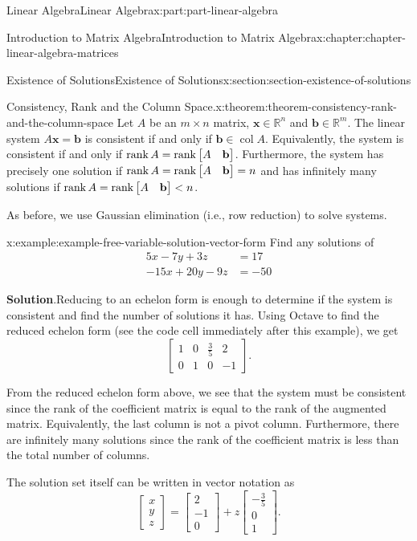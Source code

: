 \documentclass[twoside,10pt,]{book}
\newcommand{\blocktitlefont}{\relax}
\numberwithin{equation}{part}
\newcommand{\RR}{\mathbb{R}}
\providecommand{\vb}[1]{\mathbf{#1}}
\newcommand{\col}[1]{\operatorname{col}{#1}}
\providecommand{\rank}[1]{\operatorname{rank}{#1}}
\newcommand{\lt}{<}
\begin{document}
\begin{partptx}{Linear Algebra}{}{Linear Algebra}{}{}{x:part:part-linear-algebra}
\begin{chapterptx}{Introduction to Matrix Algebra}{}{Introduction to Matrix Algebra}{}{}{x:chapter:chapter-linear-algebra-matrices}
\begin{sectionptx}{Existence of Solutions}{}{Existence of Solutions}{}{}{x:section:section-existence-of-solutions}
\begin{theorem}{Consistency, Rank and the Column Space.}{}{x:theorem:theorem-consistency-rank-and-the-column-space}
Let \(A\) be an \(m\times n\) matrix, \(\vb{x}\in\RR^{n}\) and \(\vb{b}\in\RR^{m}\). The linear system \(A\vb{x} = \vb{b}\) is consistent if and only if \(\vb{b}\in\col{A}\). Equivalently, the system is consistent if and only if \(\rank{A} = \rank{\mqty[A & \vb{b}]}\). Furthermore, the system has precisely one solution if \(\rank{A} = \rank{\mqty[A & \vb{b}]} = n\) and has infinitely many solutions if \(\rank{A} = \rank{\mqty[A & \vb{b}]} \lt n\).%
\end{theorem}
As before, we use Gaussian elimination (i.e., row reduction) to solve systems.%
\begin{example}{}{x:example:example-free-variable-solution-vector-form}%
Find any solutions of%
\begin{align*}
5x - 7y + 3z &= 17\\
-15x + 20y - 9z &= -50 
\end{align*}
%
\par\smallskip%
\noindent\textbf{\blocktitlefont Solution}.\hypertarget{g:solution:idm1651004264}{}\quad{}Reducing to an echelon form is enough to determine if the system is consistent and find the number of solutions it has. Using Octave to find the reduced echelon form (see the code cell immediately after this example), we get%
\begin{equation*}
\begin{bmatrix} 1 & 0 & \frac{3}{5} & 2 \\ 0 & 1 & 0 & -1\end{bmatrix}.
\end{equation*}
%
\par
From the reduced echelon form above, we see that the system must be consistent since the rank of the coefficient matrix is equal to the rank of the augmented matrix. Equivalently, the last column is not a pivot column. Furthermore, there are infinitely many solutions since the rank of the coefficient matrix is less than the total number of columns.%
\par
The solution set itself can be written in vector notation as%
\begin{equation*}
\begin{bmatrix}x \\ y \\ z\end{bmatrix} = \begin{bmatrix}2 \\ -1 \\ 0\end{bmatrix} + z\begin{bmatrix}-\frac{3}{5} \\ 0 \\ 1\end{bmatrix}.

\end{equation*}
\end{example}
\end{sectionptx}
\end{chapterptx}
\end{partptx}
\end{document}
